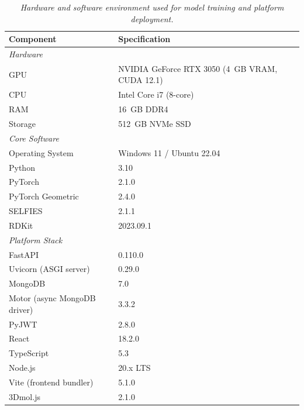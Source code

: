\documentclass[12pt,a4paper]{report}
\begin{document}
\begin{table}[htbp]
\centering
\caption{\textit{Hardware and software environment used for model training and platform deployment.}}
\label{tab:hw_sw}
\renewcommand{\arraystretch}{1.1}
\small
\begin{tabular}{p{5.5cm}p{7.0cm}}
\hline
\textbf{Component}           & \textbf{Specification} \\
\hline
\multicolumn{2}{l}{\textit{Hardware}} \\
\hline
GPU                          & NVIDIA GeForce RTX 3050 (4~GB VRAM, CUDA 12.1) \\
CPU                          & Intel Core i7 (8-core) \\
RAM                          & 16~GB DDR4 \\
Storage                      & 512~GB NVMe SSD \\
\hline
\multicolumn{2}{l}{\textit{Core Software}} \\
\hline
Operating System             & Windows 11 / Ubuntu 22.04 \\
Python                       & 3.10 \\
PyTorch                      & 2.1.0 \\
PyTorch Geometric            & 2.4.0 \\
SELFIES                      & 2.1.1 \\
RDKit                        & 2023.09.1 \\
\hline
\multicolumn{2}{l}{\textit{Platform Stack}} \\
\hline
FastAPI                      & 0.110.0 \\
Uvicorn (ASGI server)        & 0.29.0 \\
MongoDB                      & 7.0 \\
Motor (async MongoDB driver) & 3.3.2 \\
PyJWT                        & 2.8.0 \\
React                        & 18.2.0 \\
TypeScript                   & 5.3 \\
Node.js                      & 20.x LTS \\
Vite (frontend bundler)      & 5.1.0 \\
3Dmol.js                     & 2.1.0 \\
\hline
\end{tabular}
\end{table}
\normalsize

\bigskip
\newpage
\end{document}
